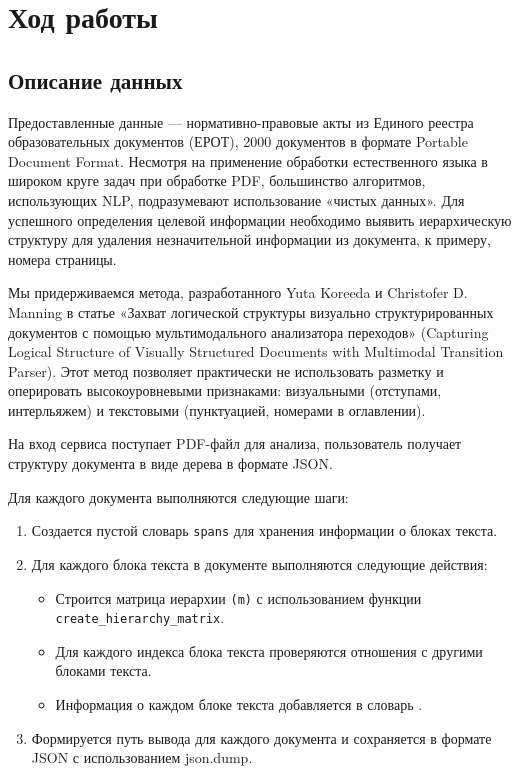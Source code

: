 \chapter{Ход работы}
\section{Описание данных}
Предоставленные данные --- нормативно-правовые акты из Единого реестра образовательных документов (ЕРОТ), 2000 документов в формате Portable Document Format. Несмотря на применение обработки естественного языка в широком круге задач при обработке PDF, большинство алгоритмов, использующих NLP, подразумевают использование «чистых данных». Для успешного определения целевой информации необходимо выявить иерархическую структуру для удаления незначительной информации из документа, к примеру, номера страницы.

Мы придерживаемся метода, разработанного Yuta Koreeda и Christofer D. Manning в статье «Захват логической структуры визуально структурированных документов с помощью мультимодального анализатора переходов» (Capturing Logical Structure of Visually Structured Documents with Multimodal Transition Parser). Этот метод позволяет практически не использовать разметку и оперировать высокоуровневыми признаками: визуальными (отступами, интерльяжем) и текстовыми (пунктуацией, номерами в оглавлении).

На вход сервиса поступает PDF-файл для анализа, пользователь получает структуру документа в виде дерева в формате JSON.

Для каждого документа выполняются следующие шаги:

\begin{enumerate}
\item Создается пустой словарь \texttt{spans} для хранения информации о блоках текста.
\item Для каждого блока текста в документе выполняются следующие действия:
  \begin{itemize}
  \item Строится матрица иерархии \texttt{(m)} с использованием функции \texttt{create\_hierarchy\_matrix}.
  \item Для каждого индекса блока текста проверяются отношения с другими блоками текста.
  \item Информация о каждом блоке текста добавляется в словарь .
  \end{itemize}
\item Формируется путь вывода  для каждого документа и сохраняется в формате JSON с использованием json.dump.
\end{enumerate}

